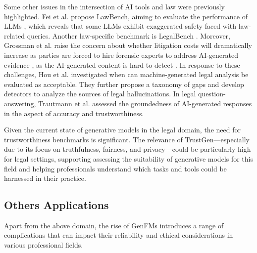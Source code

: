 Some other issues in the intersection of AI tools and law were previously highlighted. Fei et al. propose LawBench, aiming to evaluate the performance of LLMs \cite{fei2023lawbench}, which reveals that some LLMs exhibit exaggerated safety faced with law-related queries. Another law-specific benchmark is LegalBench \cite{guha2024legalbench}. Moreover, Grossman et al. raise the concern about whether litigation costs will dramatically increase as parties are forced to hire forensic experts to address AI-generated evidence \cite{grossman2023gptjudge}, as the AI-generated content is hard to detect \cite{zhang-etal-2024-llm}. In response to these challenges, Hou et al. \cite{hou2024gaps} investigated when can machine-generated legal analysis be evaluated as acceptable. They further propose a taxonomy of gaps and develop detectors to analyze the sources of legal hallucinations. In legal question-answering, Trautmann et al. \cite{trautmann2024measuring} assessed the groundedness of AI-generated responses in the aspect of accuracy and trustworthiness.

Given the current state of generative models in the legal domain, the need for trustworthiness benchmarks is significant. The relevance of TrustGen—especially due to its focus on truthfulness, fairness, and privacy—could be particularly high for legal settings, supporting assessing the suitability of generative models for this field and helping professionals understand which tasks and tools could be harnessed in their practice. 

\subsection{Others Applications}
Apart from the above domain, the rise of GenFMs introduces a range of complications that can impact their reliability and ethical considerations in various professional fields.

